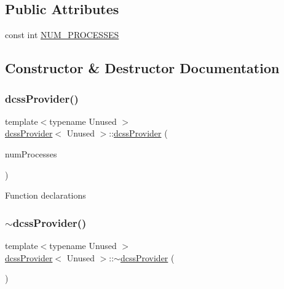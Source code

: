 \subsection*{Public Attributes}
\begin{DoxyCompactItemize}
\item 
const int \hyperlink{classdcssProvider_a54b21326a5b1a803abf3f60d35a62c37}{N\+U\+M\+\_\+\+P\+R\+O\+C\+E\+S\+S\+ES}
\end{DoxyCompactItemize}


\subsection{Constructor \& Destructor Documentation}
\mbox{\label{classdcssProvider_a3caba2c0668c1b75aa0d74272b8de625}} 
\subsubsection{\texorpdfstring{dcss\+Provider()}{dcssProvider()}}
{\footnotesize\ttfamily template$<$typename Unused $>$ \\
\hyperlink{classdcssProvider}{dcss\+Provider}$<$ Unused $>$\+::\hyperlink{classdcssProvider}{dcss\+Provider} (\begin{DoxyParamCaption}\item[{const int}]{num\+Processes }\end{DoxyParamCaption})}

Function declarations \mbox{\label{classdcssProvider_a5354fc777768de9e024c6597c54d9af3}} 
\subsubsection{\texorpdfstring{$\sim$dcss\+Provider()}{~dcssProvider()}}
{\footnotesize\ttfamily template$<$typename Unused $>$ \\
\hyperlink{classdcssProvider}{dcss\+Provider}$<$ Unused $>$\+::$\sim$\hyperlink{classdcssProvider}{dcss\+Provider} (\begin{DoxyParamCaption}{ }\end{DoxyParamCaption})}




